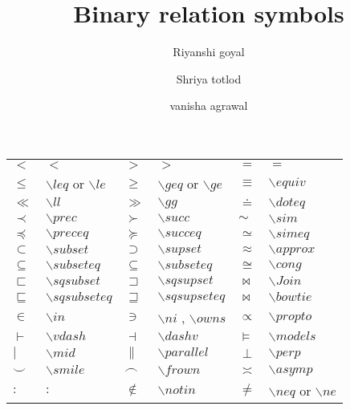 \documentclass{article}
\begin{document}
\title{Binary relation symbols}
\maketitle
\author{Riyanshi goyal\\
   \and Shriya totlod \\
   \and vanisha agrawal}
  

	\begin{center}
		\begin{tabular}{l l l l l l}
			$<$      & $<$   & $>$     & $>$   & $=$    & $=$   \\
			
			$\leq$    & $\backslash$$leq$ or $\backslash$$le$   & $\geq$   & $\backslash$$geq$ or $\backslash$$ge$  & $\equiv$  & $\backslash$$equiv$ \\
			
			$\ll$          & $\backslash$$ll$  & $\gg$  & $\backslash$$gg$ & $\doteq$  & $\backslash$$doteq$ \\
			
			$\prec$        & $\backslash$$prec$  & $\succ$  & $\backslash$$succ$  & $\sim$ & $\backslash$$sim$  \\
			
			$\preceq$   & $\backslash$$preceq$  & $\succeq$ & $\backslash$$succeq$  & $\simeq$ & $\backslash$$simeq$ \\
			
			$\subset$  & $\backslash$$subset$ & $\supset$  & $\backslash$$supset$  & $\approx$ & $\backslash$$approx$ \\
			
			$\subseteq$  &$\backslash$$subseteq$ & $\subseteq$ & $\backslash$$subseteq$ & $\cong$ & $\backslash$$cong$ \\
			
			$\sqsubset$  & $\backslash$$sqsubset$  & $\sqsupset$  & $\backslash$$sqsupset$ & $\Join$ & $\backslash$$Join$ \\
			
			$\sqsubseteq$  &$\backslash$$sqsubseteq$ & $\sqsupseteq$ & $\backslash$$sqsupseteq$ & $\bowtie$ & $\backslash$$bowtie$ \\
			
			$\in$   & $\backslash$$in$  & $\ni$  & $\backslash$$ni$ , $\backslash$$owns$ & $\propto$ & $\backslash$$propto$ \\
			
			$\vdash$  & $\backslash$$vdash$ & $\dashv$  & $\backslash$$dashv$ & $\models$ & $\backslash$$models$ \\
			
			$\mid$ &$\backslash$$mid$ & $\parallel$ & $\backslash$$parallel$  & $\perp$ & $\backslash$$perp$ \\
			
			$\smile$ &$\backslash$$smile$  & $\frown$  & $\backslash$$frown$ &  $\asymp$&  $\backslash$$asymp$ \\
			
			$:$  & $:$  & $\notin$  &  $\backslash$$notin$  & $\neq$  & $\backslash$$neq$ or $\backslash$$ne$\\
		\end{tabular}
	\end{center}
\end{document}
